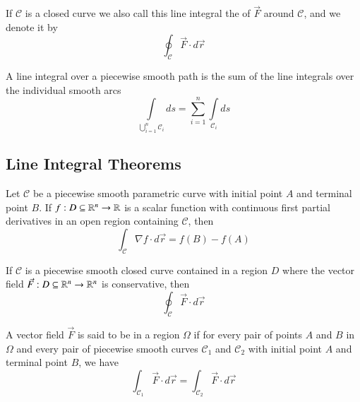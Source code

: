 \begin{appendices}
    \begin{defn}
        If $\mathcal{C}$ is a closed curve we also call this line integral the  of $\vec{F}$ around $\mathcal{C}$, and we denote it by \begin{equation}
            \oint_{\mathcal{C}}\vec{F} \cdot d\vec{r}
        \end{equation}
    \end{defn}
    
    \begin{rmk}
        A line integral over a piecewise smooth path is the sum of the line integrals over the individual smooth arcs \begin{equation}
            \int\limits_{\bigcup_{i=1}^n\mathcal{C}_i}ds = \sum\limits_{i=1}^n\int\limits_{\mathcal{C}_i}ds
        \end{equation}
    \end{rmk}
    
    \subsection{Line Integral Theorems}
    
    \begin{namthm}
        Let $\mathcal{C}$ be a piecewise smooth parametric curve with initial point $A$ and terminal point $B$. If $f:D \subseteq \mathbb R^n \rightarrow \mathbb R$ is a scalar function with continuous first partial derivatives in an open region containing $\mathcal{C}$, then \begin{equation}
            \int_{\mathcal{C}}\nabla f\cdot d\vec{r} = f(B) - f(A)
        \end{equation} 
    \end{namthm}
    
    \begin{cor}
        If $\mathcal{C}$ is a piecewise smooth closed curve contained in a region $D$ where the vector field $\vec{F}:D\subseteq \mathbb R^n\rightarrow \mathbb R^n$ is conservative, then \begin{equation}
            \oint_{\mathcal{C}}\vec{F}\cdot d\vec{r}
        \end{equation}
    \end{cor}
    
    \begin{defn}
        A vector field $\vec{F}$ is said to be  in a region $\Omega$ if for every pair of points $A$ and $B$ in $\Omega$ and every pair of piecewise smooth curves $\mathcal{C}_1$ and $\mathcal{C}_2$ with initial point $A$ and terminal point $B$, we have \begin{equation}
            \int_{\mathcal{C}_1}\vec{F}\cdot d\vec{r} = \int_{\mathcal{C}_2}\vec{F}\cdot d\vec{r}
        \end{equation}
    \end{defn}
    

\end{appendices}
